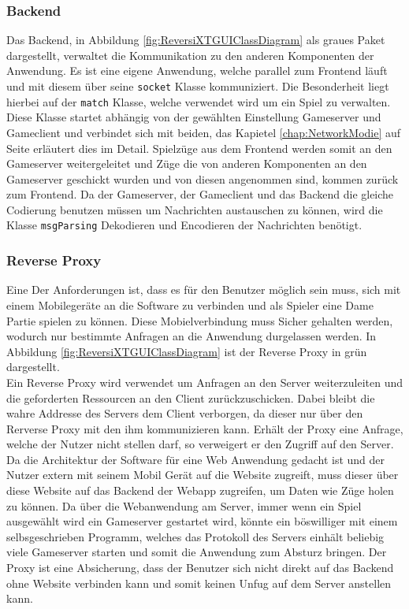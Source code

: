 \documentclass[12pt,a4paper,bibliography=totocnumbered,listof=totocnumbered]{article}
\begin{document}
\subsubsection{Backend}
Das Backend, in Abbildung \ref{fig:ReversiXTGUIClassDiagram} als graues Paket dargestellt, verwaltet die Kommunikation zu den anderen Komponenten der Anwendung.
Es ist eine eigene Anwendung, welche parallel zum Frontend läuft und mit diesem über seine \texttt{socket} Klasse kommuniziert.
Die Besonderheit liegt hierbei auf der \texttt{match} Klasse, welche verwendet wird um ein Spiel zu verwalten. 
Diese Klasse startet abhängig von der gewählten Einstellung Gameserver und Gameclient und verbindet sich mit beiden, das Kapietel \ref{chap:NetworkModie} auf 
Seite \pageref{chap:NetworkModie} erläutert dies im Detail. Spielzüge aus dem Frontend werden somit 
an den Gameserver weitergeleitet und Züge die von anderen Komponenten an den Gameserver geschickt wurden und von diesen angenommen sind, kommen zurück zum Frontend.
Da der Gameserver, der Gameclient und das Backend die gleiche Codierung benutzen müssen um Nachrichten austauschen zu können, wird 
die Klasse \texttt{msgParsing} Dekodieren und Encodieren der Nachrichten benötigt.

\subsubsection{Reverse Proxy}
Eine Der Anforderungen ist, dass es für den Benutzer möglich sein muss, sich mit einem Mobilegeräte an die Software zu verbinden und als Spieler eine
Dame Partie spielen zu können. Diese Mobielverbindung muss Sicher gehalten werden, wodurch nur bestimmte Anfragen an die Anwendung durgelassen werden.
In Abbildung \ref{fig:ReversiXTGUIClassDiagram} ist der Reverse Proxy in grün dargestellt.
\\ 
Ein Reverse Proxy wird verwendet um Anfragen an den Server weiterzuleiten und die geforderten Ressourcen an den Client zurückzuschicken. Dabei 
bleibt die wahre Addresse des Servers dem Client verborgen, da dieser nur über den Rerverse Proxy mit den ihm kommunizieren kann.
Erhält der Proxy eine Anfrage, welche der Nutzer nicht stellen darf, so verweigert er den Zugriff auf den Server.
\\
Da die Architektur der Software für eine Web Anwendung gedacht ist und der Nutzer extern mit seinem Mobil Gerät auf die Website zugreift, 
muss dieser über diese Website auf das Backend der Webapp zugreifen, um Daten wie Züge holen zu können.
Da über die Webanwendung am Server, immer wenn ein Spiel ausgewählt wird ein Gameserver gestartet wird, könnte ein böswilliger
mit einem selbsgeschrieben Programm, welches das Protokoll des Servers einhält beliebig viele Gameserver starten und somit die 
Anwendung zum Absturz bringen.
Der Proxy ist eine Absicherung, dass der Benutzer sich nicht direkt auf das Backend ohne Website verbinden kann und somit 
keinen Unfug auf dem Server anstellen kann. 
\end{document}
